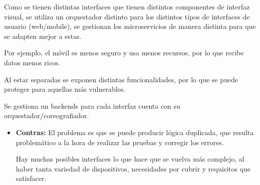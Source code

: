 \documentclass[12pt, twoside, openright]{report} %
\begin{document}
Como se tienen distintas interfaces que tienen distintos componentes de interfaz visual, se utiliza un orquestador distinto para los distintos tipos de interfaces de usuario (web/mobile), se gestionan los microservicios de manera distinta para que se adapten mejor a estas.

Por ejemplo, el móvil es menos seguro y usa menos recursos, por lo que recibe datos menos ricos.

Al estar separadas se exponen distintas funcionalidades, por lo que se puede proteger para aquellas más vulnerables.

Se gestiona un backends para cada interfaz cuenta con su orquestador/coreografiador.

\begin{itemize}
	\item \textbf{Contras:} El problema es que se puede producir lógica duplicada, que resulta problemático a la hora de realizar las pruebas y corregir los errores.

	      Hay muchas posibles interfaces lo que hace que se vuelva más complejo, al haber tanta variedad de dispositivos, necesidades por cubrir y requisitos que satisfacer.
\end{itemize}
\pagebreak
\end{document}

